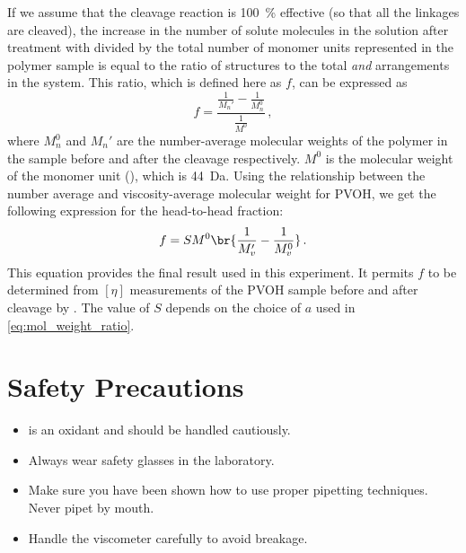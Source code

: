\documentclass[nobib,nofonts,nols,nohyper]{tufte-handout}
\begin{document}
If we assume that the cleavage reaction is \qty{100}{\percent} effective (so that all the  linkages are cleaved), the increase in the number of solute molecules in the solution after treatment with  divided by the total number of monomer units represented in the polymer sample is equal to the ratio of  structures to the total  \emph{and}  arrangements in the system. 
This ratio, which is defined here as \( f \), can be expressed as
\begin{equation}
	f = \frac{\frac{1}{M_n'} - \frac{1}{M_n^0}}{\frac{1}{M^0}} \, ,
	\label{eq:frac_glycol}
\end{equation}
where \( M_n^0 \) and \( M_n' \) are the number-average molecular weights of the polymer in the sample before
and after the  cleavage respectively. 
\( M^0 \) is the molecular weight of the monomer unit (), which is \qty{44}{\dalton}. 
Using the relationship between the number average and viscosity-average molecular weight for PVOH, we get the following expression for the head-to-head fraction:
\begin{equation}
	f = S M^0 \br{\frac{1}{M_v'} - \frac{1}{M_v^0}}\, .
	\label{eq:h2h_frac}
\end{equation}
This equation provides the final result used in this experiment. 
It permits \( f \) to be determined from \( [\eta] \) measurements of the PVOH sample before and after cleavage by . The value of \( S \) depends on the choice of \( a \) used in \cref{eq:mol_weight_ratio}.



\pagebreak

\section{Safety Precautions} %
\label{sec:safety}

\begin{itemize}
	\item {} is an oxidant and should be handled cautiously. 
	\item Always wear safety glasses in the laboratory.
	\item Make sure you have been shown how to use proper pipetting techniques. 
	Never pipet by mouth.
	\item Handle the viscometer carefully to avoid breakage. 
\end{itemize}
\end{document}
